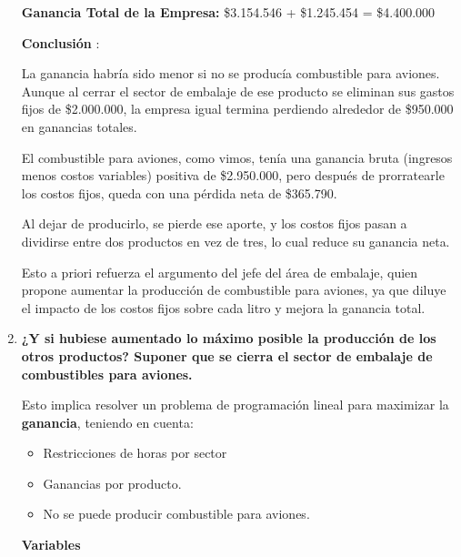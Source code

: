 \documentclass[10pt,a4paper]{article}
\begin{document}
\begin{enumerate}[label=\textbf{\sffamily\large\arabic*.}]
    \vspace{0.5em}

    \textbf{Ganancia Total de la Empresa: } \$3.154.546 + \$1.245.454  = \$4.400.000

    \vspace{0.5em}

    \textbf{Conclusión }:

    La ganancia habría sido menor si no se producía combustible para aviones.
Aunque al cerrar el sector de embalaje de ese producto se eliminan sus gastos fijos de \$2.000.000, la empresa igual termina perdiendo alrededor de \$950.000 en ganancias totales.

El combustible para aviones, como vimos, tenía una ganancia bruta (ingresos menos costos variables) positiva de \$2.950.000, pero después de prorratearle los costos fijos, queda con una pérdida neta de \$365.790.

Al dejar de producirlo, se pierde ese aporte, y los costos fijos pasan a dividirse entre dos productos en vez de tres, lo cual reduce su ganancia neta.

    Esto a priori refuerza el argumento del jefe del área de embalaje, quien propone aumentar la producción de combustible para aviones, 
    ya que diluye el impacto de los costos fijos sobre cada litro y mejora la ganancia total. \\
    
    \item {\bfseries\large ¿Y si hubiese aumentado lo máximo posible la producción de los otros productos? Suponer que se cierra el
    sector de embalaje de combustibles para aviones.}

    Esto implica resolver un problema de programación lineal para maximizar la \textbf{ganancia}, teniendo en cuenta:

    \begin{itemize}

        \item Restricciones de horas por sector
        \item Ganancias por producto.
        \item No se puede producir combustible para aviones. \\

    \end{itemize}

    \textbf{Variables}

    \begin{itemize}


\end{itemize}
\end{enumerate}
\end{document}

